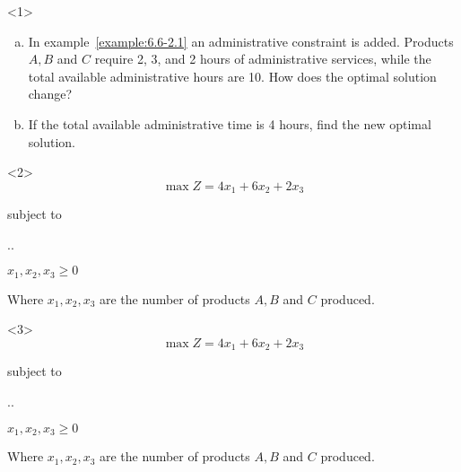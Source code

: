 \begin{frameExample}{\label{example:6.6-5.1}}{}
  \begin{onlyenv}<1>
    \begin{enumerate}[a)] \justifying \parskip4mm
  \item In example~\ref{example:6.6-2.1} an administrative constraint is added. Products $A, B$ and $C$ require 2, 3, and 2 hours of administrative services, while the total available administrative hours are 10. How does the optimal solution change?
  \item \label{example08} If the total available administrative time is 4 hours, find the new optimal solution.
  \end{enumerate}
  \end{onlyenv}


\begin{onlyenv}<2>
        \[\max Z = 4x_1 +6x_2 +2x_3  \]

  {\centering
    subject to

    \vspace{3mm}
    \sysdelim..%

  $x_1, x_2, x_3 \geq 0$
  \par}

  Where   $x_1, x_2, x_3$ are the number of products $A, B$ and $C$ produced.
\end{onlyenv}

\begin{onlyenv}<3>
        \[\max Z = 4x_1 +6x_2 +2x_3  \]

  {\centering
    subject to

    \vspace{3mm}
    \sysdelim..%

  $x_1, x_2, x_3 \geq 0$
  \par}

  Where   $x_1, x_2, x_3$ are the number of products $A, B$ and $C$ produced.
\end{onlyenv}
\end{frameExample}

